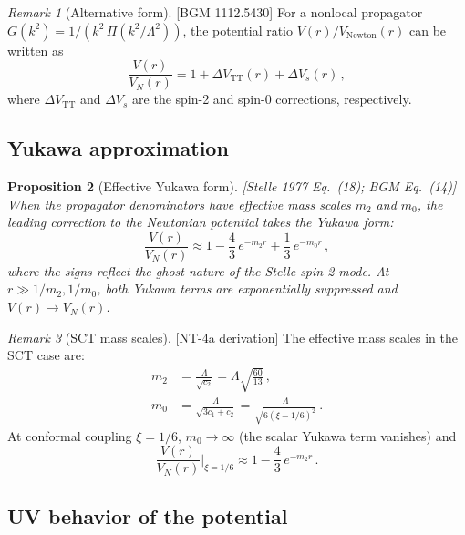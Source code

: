 \documentclass[12pt,a4paper]{article}
\newtheorem{proposition}{Proposition}[section]
\theoremstyle{definition}
\theoremstyle{remark}
\newtheorem{remark}[proposition]{Remark}
\newcommand{\fromlit}[1]{\textcolor{blue!70!black}{\textsf{[#1]}}}
\begin{document}
\begin{remark}[Alternative form]
\fromlit{BGM 1112.5430}
For a nonlocal propagator $G(k^2) = 1/(k^2\,\Pi(k^2/\Lambda^2))$,
the potential ratio $V(r)/V_{\text{Newton}}(r)$ can be written as
\begin{equation}
  \frac{V(r)}{V_N(r)} = 1 + \Delta V_{\text{TT}}(r)
  + \Delta V_s(r)\,,
  \label{eq:potential-ratio}
\end{equation}
where $\Delta V_{\text{TT}}$ and $\Delta V_s$ are the spin-2 and
spin-0 corrections, respectively.
\end{remark}


\subsection{Yukawa approximation}

\begin{proposition}[Effective Yukawa form]
\label{prop:yukawa}
\fromlit{Stelle 1977 Eq.~(18); BGM Eq.~(14)}
When the propagator denominators have effective mass scales
$m_2$ and $m_0$, the leading correction to the Newtonian potential
takes the Yukawa form:
\begin{equation}
  \frac{V(r)}{V_N(r)} \approx
  1 - \frac{4}{3}\,e^{-m_2 r}
  + \frac{1}{3}\,e^{-m_0 r}\,,
  \label{eq:yukawa-approx}
\end{equation}
where the signs reflect the ghost nature of the Stelle spin-2 mode.
At $r \gg 1/m_2, 1/m_0$, both Yukawa terms are exponentially
suppressed and $V(r) \to V_N(r)$.
\end{proposition}

\begin{remark}[SCT mass scales]
\fromlit{NT-4a derivation}
The effective mass scales in the SCT case are:
\begin{align}
  m_2 &= \frac{\Lambda}{\sqrt{c_2}}
  = \Lambda\sqrt{\frac{60}{13}}\,,
    \label{eq:m2}\\
  m_0 &= \frac{\Lambda}{\sqrt{3c_1+c_2}}
  = \frac{\Lambda}{\sqrt{6(\xi-1/6)^2}}\,.
    \label{eq:m0}
\end{align}
At conformal coupling $\xi = 1/6$, $m_0 \to \infty$ (the scalar
Yukawa term vanishes) and
\begin{equation}
  \frac{V(r)}{V_N(r)}\bigg|_{\xi=1/6}
  \approx 1 - \frac{4}{3}\,e^{-m_2 r}\,.
  \label{eq:yukawa-conformal}
\end{equation}
\end{remark}


\subsection{UV behavior of the potential}
\end{document}
